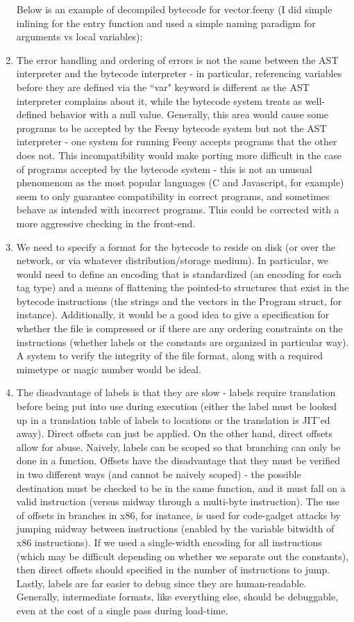\documentclass[notitlepage]{report}
\begin{document}
\begin{enumerate}
		Below is an example of decompiled bytecode for vector.feeny (I did simple inlining for the entry function and used a simple naming paradigm for arguments vs local variables):
		{\scriptsize
			
		}
	\item %
		The error handling and ordering of errors is not the same between the AST interpreter and the bytecode interpreter - in particular, referencing variables before they are defined via the ``var" keyword is different as the AST interpreter complains about it, while the bytecode system treats as well-defined behavior with a null value.  Generally, this area would cause some programs to be accepted by the Feeny bytecode system but not the AST interpreter - one system for running Feeny accepts programs that the other does not.  This incompatibility would make porting more difficult in the case of programs accepted by the bytecode system - this is not an unusual phenomenom as the most popular languages (C and Javascript, for example) seem to only guarantee compatibility in correct programs, and sometimes behave as intended with incorrect programs.  This could be corrected with a more aggressive checking in the front-end.
	\item We need to specify a format for the bytecode to reside on disk (or over the network, or via whatever distribution/storage medium).  In particular, we would need to define an encoding that is standardized (an encoding for each tag type) and a means of flattening the pointed-to structures that exist in the bytecode instructions (the strings and the vectors in the Program struct, for instance).  Additionally, it would be a good idea to give a specification for whether the file is compressed or if there are any ordering constraints on the instructions (whether labels or the constants are organized in particular way).  A system to verify the integrity of the file format, along with a required mimetype or magic number would be ideal.
	\item The disadvantage of labels is that they are slow - labels require translation before being put into use during execution (either the label must be looked up in a translation table of labels to locations or the translation is JIT'ed away).  Direct offsets can just be applied.  On the other hand, direct offsets allow for abuse.  Naively, labels can be scoped so that branching can only be done in a function.  Offsets have the disadvantage that they must be verified in two different ways (and cannot be naively scoped) - the possible destination must be checked to be in the same function, and it must fall on a valid instruction (versus midway through a multi-byte instruction).  The use of offsets in branches in x86, for instance, is used for code-gadget attacks by jumping midway between instructions (enabled by the variable bitwidth of x86 instructions).  If we used a single-width encoding for all instructions (which may be difficult depending on whether we separate out the constants), then direct offsets should specified in the number of instructions to jump.\\

		Lastly, labels are far easier to debug since they are human-readable.  Generally, intermediate formats, like everything else, should be debuggable, even at the cost of a single pass during load-time.
\end{enumerate}
\end{document}
